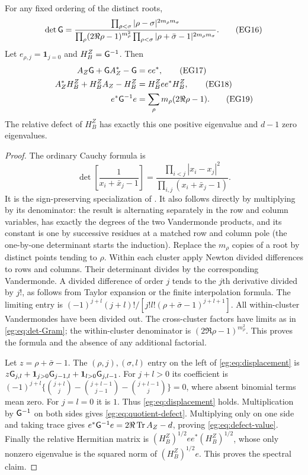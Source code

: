 \begin{egtheorem}
\label{eg:thm:Cauchy-displacement}
For any fixed ordering of the distinct roots,
\[
 \det\mathsf G=
 \frac{\prod_{\rho<\sigma}|\rho-\sigma|^{2m_\rho m_\sigma}}
 {\prod_\rho(2\Re\rho-1)^{m_\rho^2}
  \prod_{\rho<\sigma}|\rho+\bar\sigma-1|^{2m_\rho m_\sigma}}.
 \tag{EG16}\label{eg:eq:det-Gram}
\]
Let $e_{\rho,j}=\mathbf1_{j=0}$ and $H_B^Z=\mathsf G^{-1}$. Then
\begin{align}
 A_Z\mathsf G+\mathsf G A_Z^*-\mathsf G&=ee^*,\tag{EG17}\label{eg:eq:displacement}\\
 A_Z^*H_B^Z+H_B^ZA_Z-H_B^Z&=H_B^Zee^*H_B^Z,\tag{EG18}\label{eg:eq:quotient-defect}\\
 e^*\mathsf G^{-1}e&=\sum_\rho m_\rho(2\Re\rho-1).\tag{EG19}\label{eg:eq:defect-value}
\end{align}
The relative defect of $H_B^Z$ has exactly this one positive eigenvalue
and $d-1$ zero eigenvalues.
\end{egtheorem}
\begin{proof}
The ordinary Cauchy formula is
\[
 \det\left[\frac1{x_i+\bar x_j-1}\right]
 =\frac{\prod_{i<j}|x_i-x_j|^2}{\prod_{i,j}(x_i+\bar x_j-1)}.
\]
It is the sign-preserving specialization of \cite[(1.3.14)]{eg:DLMFCauchy}.
It also follows directly by multiplying by its denominator: the
result is alternating separately in the row and column variables,
has exactly the degrees of the two Vandermonde products, and its
constant is one by successive residues at a matched row and column
pole (the one-by-one determinant starts the induction).
Replace the $m_\rho$ copies of a root by distinct points tending to
$\rho$. Within each cluster apply Newton divided differences to
rows and columns. Their determinant divides by the corresponding
Vandermonde. A divided difference of order $j$ tends to the $j$th
derivative divided by $j!$, as follows from Taylor expansion or
the finite interpolation formula. The limiting entry is
$(-1)^{j+l}(j+l)!/[j!l!(\rho+\bar\sigma-1)^{j+l+1}]$.
All within-cluster Vandermondes have been divided out. The
cross-cluster factors have limits as in \eqref{eg:eq:det-Gram}; the
within-cluster denominator is $(2\Re\rho-1)^{m_\rho^2}$. This
proves the formula and the absence of any additional factorial.

Let $z=\rho+\bar\sigma-1$. The $(\rho,j),(\sigma,l)$ entry on
the left of \eqref{eg:eq:displacement} is
$z\mathsf G_{j,l}+\mathbf1_{j>0}\mathsf G_{j-1,l}
+\mathbf1_{l>0}\mathsf G_{j,l-1}$. For $j+l>0$ its coefficient is
$(-1)^{j+l}\{\binom{j+l}{j}-\binom{j+l-1}{j-1}
-\binom{j+l-1}{j}\}=0$, where absent binomial terms mean zero.
For $j=l=0$ it is $1$. Thus \eqref{eg:eq:displacement} holds.
Multiplication by $\mathsf G^{-1}$ on both sides gives
\eqref{eg:eq:quotient-defect}. Multiplying only on one side and taking
trace gives $e^*\mathsf G^{-1}e=2\Re\operatorname{Tr} A_Z-d$, proving
\eqref{eg:eq:defect-value}. Finally the relative Hermitian matrix is
$(H_B^Z)^{1/2}ee^*(H_B^Z)^{1/2}$, whose only nonzero eigenvalue
is the squared norm of $(H_B^Z)^{1/2}e$. This proves the spectral claim.
\end{proof}

